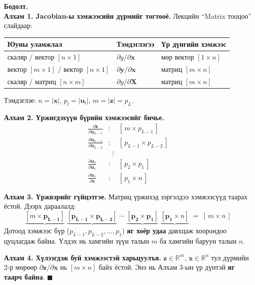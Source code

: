 \documentclass[11pt]{article}
\newenvironment{solution}[1][\textbf{Бодолт.}]
    { \noindent #1 \smallskip \\ }
    { \medskip }
\begin{document}
\begin{solution}
\textbf{Алхам 1. Jacobian-ы хэмжээсийн дүрмийг тогтооё.}
Лекцийн ``Matrix тооцоо'' слайдаар:
\begin{center}
\begin{tabular}{lll}
\toprule
\textbf{Юуны уламжлал} & \textbf{Тэмдэглэгээ} & \textbf{Үр дүнгийн хэмжээс} \\
\midrule
скаляр / вектор $[n\times 1]$       & $\partial y / \partial \mathbf{x}$        & мөр вектор $[1\times n]$ \\
вектор $[m\times 1]$ / вектор $[n\times 1]$ & $\partial \mathbf{y} / \partial \mathbf{x}$ & матриц $[m\times n]$ \\
скаляр / матриц $[n\times m]$       & $\partial y / \partial \mathbf{X}$        & матриц $[m\times n]$ \\
\bottomrule
\end{tabular}
\end{center}

\noindent
Тэмдэглэе: $n = |\mathbf{x}|$, \quad $p_l = |\mathbf{u}_l|$, \quad
$m = |\mathbf{z}| = p_L$.

\medskip
\textbf{Алхам 2. Үржигдэхүүн бүрийн хэмжээсийг бичье.}
\begin{align*}
\frac{\partial \mathbf{z}}{\partial \mathbf{u}_{L-1}}         &: \quad [\,m \times p_{L-1}\,] \\
\frac{\partial \mathbf{u}_{L-1}}{\partial \mathbf{u}_{L-2}}   &: \quad [\,p_{L-1} \times p_{L-2}\,] \\
&\;\;\vdots \\
\frac{\partial \mathbf{u}_{2}}{\partial \mathbf{u}_{1}}       &: \quad [\,p_{2} \times p_{1}\,] \\
\frac{\partial \mathbf{u}_{1}}{\partial \mathbf{x}}           &: \quad [\,p_{1} \times n\,]
\end{align*}

\textbf{Алхам 3. Үржвэрийг гүйцэтгэе.}
Матриц үржихэд зэргэлдээ хэмжээсүүд таарах ёстой. Дээрх дараалалд:
\[
\underbrace{[m \times \mathbf{p_{L-1}}]}_{}\;
\underbrace{[\mathbf{p_{L-1}} \times \mathbf{p_{L-2}}]}_{}\;
\cdots\;
\underbrace{[\mathbf{p_{2}} \times \mathbf{p_{1}}]}_{}\;
\underbrace{[\mathbf{p_{1}} \times n]}_{}
\;=\; [\,m \times n\,]
\]
Дотоод хэмжээс бүр ($p_{L-1}, p_{L-2}, \dots, p_1$) \textbf{яг хоёр удаа} давхцаж
хоорондоо цуцлагдаж байна. Үлдэх нь хамгийн зүүн талын $m$ ба хамгийн баруун талын $n$.

\medskip
\textbf{Алхам 4. Хүлээгдэж буй хэмжээстэй харьцуулъя.}
$\mathbf{z} \in \mathbb{R}^m$, $\mathbf{x} \in \mathbb{R}^n$ тул дүрмийн 2-р мөрөөр
$\partial \mathbf{z} / \partial \mathbf{x}$ нь $[m \times n]$ байх ёстой.
Энэ нь Алхам 3-ын үр дүнтэй \textbf{яг таарч байна}. $\blacksquare$


\end{solution}
\end{document}
